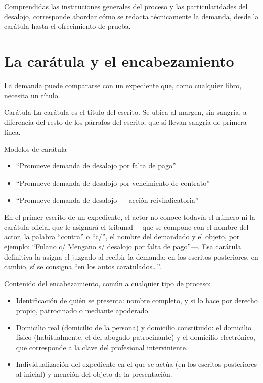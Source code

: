 \documentclass[12pt,oneside]{book}
\begin{document}
Comprendidas las instituciones generales del proceso y las particularidades del desalojo, corresponde abordar cómo se redacta técnicamente la demanda, desde la carátula hasta el ofrecimiento de prueba.

\section{La carátula y el encabezamiento}

La demanda puede compararse con un expediente que, como cualquier libro, necesita un título.

\begin{definition}{Carátula}
La carátula es el título del escrito. Se ubica al margen, sin sangría, a diferencia del resto de los párrafos del escrito, que sí llevan sangría de primera línea.
\end{definition}

\begin{example}{Modelos de carátula}
\begin{itemize}
    \item ``Promueve demanda de desalojo por falta de pago''
    \item ``Promueve demanda de desalojo por vencimiento de contrato''
    \item ``Promueve demanda de desalojo — acción reivindicatoria''
\end{itemize}
\end{example}

En el primer escrito de un expediente, el actor no conoce todavía el número ni la carátula oficial que le asignará el tribunal —que se compone con el nombre del actor, la palabra ``contra'' o ``c/'', el nombre del demandado y el objeto, por ejemplo: ``Fulano c/ Mengano s/ desalojo por falta de pago''—. Esa carátula definitiva la asigna el juzgado al recibir la demanda; en los escritos posteriores, en cambio, sí se consigna ``en los autos caratulados\dots''.

\begin{important}
Contenido del encabezamiento, común a cualquier tipo de proceso:
\begin{itemize}
    \item Identificación de quién se presenta: nombre completo, y si lo hace por derecho propio, patrocinado o mediante apoderado.
    \item Domicilio real (domicilio de la persona) y domicilio constituido: el domicilio físico (habitualmente, el del abogado patrocinante) y el domicilio electrónico, que corresponde a la clave del profesional interviniente.
    \item Individualización del expediente en el que se actúa (en los escritos posteriores al inicial) y mención del objeto de la presentación.
\end{itemize}
\end{important}
\end{document}
